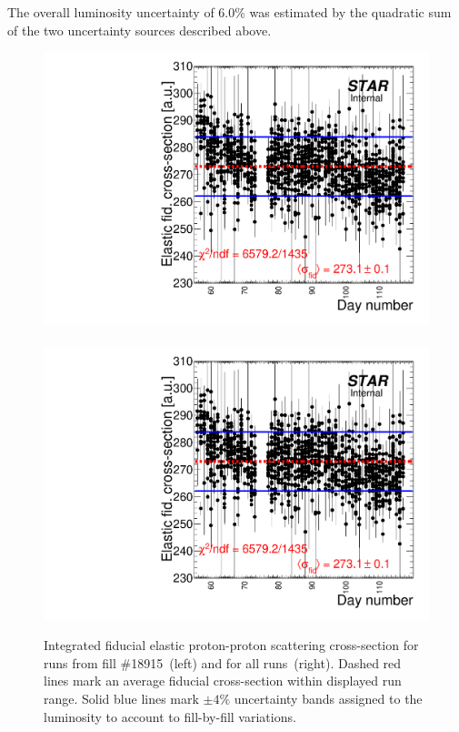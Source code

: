 \indent
The overall luminosity uncertainty of 6.0\% was estimated by the quadratic sum of the two uncertainty sources described above.

% 
% 
% 
% 
\begin{figure}[h]
\centering
\includegraphics[width=.48\textwidth,page=5]{graphics/systematics/sigmaVsRunNumber_elastic.pdf}~~~~
\includegraphics[width=.48\textwidth]{graphics/systematics/sigmaVsRunNumber_elastic.pdf}
\caption[Luminosity uncertainty systematics.]{Integrated fiducial elastic proton-proton scattering cross-section for runs from fill \#18915~(left) and for all runs~(right). Dashed red lines mark an average fiducial cross-section within displayed run range. Solid blue lines mark $\pm4\%$ uncertainty bands assigned to the luminosity to account to fill-by-fill variations.}
\label{fig:lumiSyst_elastic}
\end{figure}


